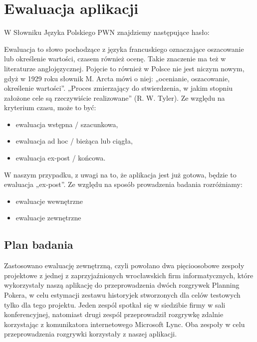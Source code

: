 ﻿\chapter{Ewaluacja aplikacji}

W Słowniku Języka Polskiego PWN znajdziemy następujące hasło: \begin{quote}
\end{quote}
Ewaluacja to słowo pochodzące z języka francuskiego oznaczające oszacowanie lub określenie wartości, czasem również ocenę. Takie znaczenie ma też w literaturze anglojęzycznej. Pojęcie to również w Polsce nie jest niczym nowym, gdyż w 1929 roku słownik M. Arcta mówi o niej: „ocenianie, oszacowanie, określenie wartości”. „Proces zmierzający do stwierdzenia, w jakim stopniu założone cele są rzeczywiście realizowane” (R. W. Tyler). Ze względu na kryterium czasu, może to być:
\begin{itemize}
    \item ewaluacja wstępna / szacunkowa,
    \item ewaluacja ad hoc / bieżąca lub ciągła,
    \item ewaluacja ex-post / końcowa.
\end{itemize}
W naszym przypadku, z uwagi na to, że aplikacja jest już gotowa, będzie to ewaluacja „ex-post”. \newline
Ze względu na sposób prowadzenia badania rozróżniamy:
\begin{itemize}
    \item ewaluacje wewnętrzne
    \item ewaluacje zewnętrzne
\end{itemize}

\section{Plan badania}
Zastosowano ewaluację zewnętrzną, czyli powołano dwa pięcioosobowe zespoły projektowe z
jednej z zaprzyjaźnionych wrocławskich firm informatycznych, które wykorzystały naszą aplikację do
przeprowadzenia dwóch rozgrywek Planning Pokera, w celu estymacji zestawu historyjek stworzonych dla
celów testowych tylko dla tego projektu. Jeden zespól spotkał się w siedzibie firmy w sali konferencyjnej,
natomiast drugi zespól przeprowadził rozgrywkę zdalnie korzystając z komunikatora internetowego Microsoft
Lync. Oba zespoły w celu przeprowadzenia rozgrywki korzystały z naszej aplikacji.
